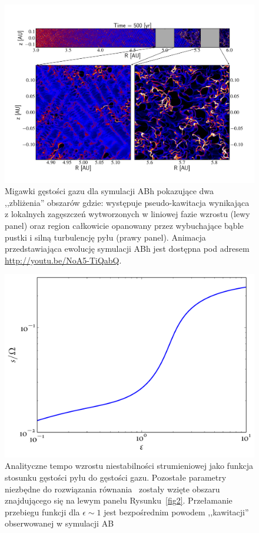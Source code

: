 \begin{figure} 
\centering
\includegraphics[width=0.98\linewidth]{figures/fig3}
\caption{Migawki gęstości gazu dla symulacji ABh pokazujące dwa ,,zbliżenia''
   obszarów gdzie: występuje pseudo-kawitacja wynikająca z lokalnych zagęszczeń
   wytworzonych w liniowej fazie wzrostu (lewy panel) oraz region całkowicie
   opanowany przez wybuchające bąble pustki i silną turbulencję pyłu (prawy
   panel). Animacja przedstawiająca ewolucję symulacji ABh jest dostępna pod
   adresem \href{http://youtu.be/NoA5-TiQabQ}{http://youtu.be/NoA5-TiQabQ}.}
\label{fig3}
\end{figure}

\begin{figure}
   \centering
   \includegraphics[width=0.5\linewidth]{figures/growthAB}
   \caption{Analityczne tempo wzrostu niestabilności strumieniowej jako funkcja
      stosunku gęstości pyłu do gęstości gazu. Pozostałe parametry niezbędne do
      rozwiązania równania~ zostały wzięte obszaru znajdującego
      się na lewym panelu Rysunku~\ref{fig2}. Przełamanie przebiegu funkcji dla
      $\epsilon\sim 1$ jest bezpośrednim powodem ,,kawitacji'' obserwowanej w
      symulacji AB}
   \label{fig2b}
\end{figure}


